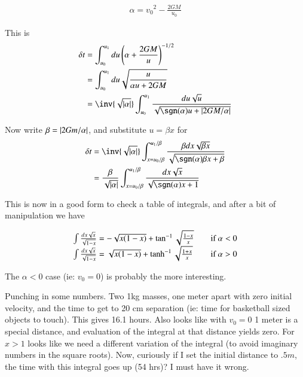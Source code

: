 \begin{align*}
\alpha = {v_0}^2 - \frac{2GM}{u_0}
\end{align*}

This is
\begin{align*}
\delta t 
&=  \int_{u_0}^{u_1} du \left(\alpha + \frac{2 G M}{u} \right)^{-1/2} \\
&=  \int_{u_0}^{u_1} du \sqrt{\frac{u}{\alpha u + 2 G M}} \\
&=  \inv{\sqrt{\Abs{\alpha}}} \int_{u_0}^{u_1} \frac{du \sqrt{u}}{\sqrt{\sgn(\alpha) u + \Abs{2 G M/\alpha}}}
\end{align*}

Now write $\beta = \left\lvert{2Gm/\alpha}\right\rvert$, and substitute $u = \beta x$ for
\begin{align*}
\delta t 
&=  \inv{\sqrt{\Abs{\alpha}}} \int_{x= u_0/\beta}^{u_1/\beta} \frac{\beta dx \sqrt{\beta x}}{\sqrt{\sgn(\alpha) \beta x + \beta}} \\
&=  \frac{\beta}{\sqrt{\Abs{\alpha}}} \int_{x= u_0/\beta}^{u_1/\beta} \frac{dx \sqrt{ x}}{\sqrt{\sgn(\alpha)  x + 1}} \\
\end{align*}

This is now in a good form to check a table of integrals, and after a bit of manipulation we have

\begin{align*}
\begin{array}{l l}
\int \frac{dx \sqrt{ x}}{\sqrt{1 - x}} = - \sqrt{x(1-x)} + \tan^{-1}{\sqrt{\frac{1-x}{x}}} & \quad \mbox{if $\alpha < 0$} \\
\int \frac{dx \sqrt{ x}}{\sqrt{1 - x}} = \sqrt{x(1-x)} + \tanh^{-1}{\sqrt{\frac{1+x}{x}}} & \quad \mbox{if $\alpha > 0$} \\
\end{array}
\end{align*}

The $\alpha < 0$ case (ie: $v_0 = 0$) is probably the more interesting.

Punching in some numbers.  Two 1kg masses, one meter apart with zero initial velocity, and the time to get to 20 cm separation (ie: time for basketball sized objects to touch).  This gives 16.1 hours.  Also looks like with $v_0 = 0$ 1 meter is a special distance, and evaluation of the integral at that distance yields zero.  For $x>1$ looks like we need a different variation of the integral (to avoid imaginary numbers in the square roots).  Now, curiously if I set the initial distance to $.5 m$, the time with this integral goes up (54 hrs)?  I must have it wrong.

